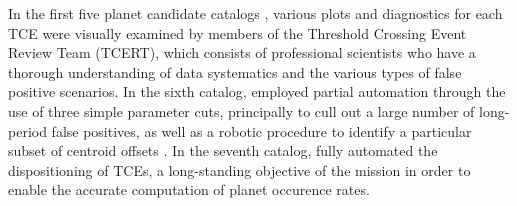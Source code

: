 In the first five \Kepler{} planet candidate catalogs \citep{Borucki2011a,Borucki2011b,Batalha2013,Burke2014,Rowe2015a}, various plots and diagnostics for each TCE were visually examined by members of the Threshold Crossing Event Review Team (TCERT), which consists of professional scientists who have a thorough understanding of \kepler{} data systematics and the various types of false positive scenarios. In the sixth catalog, \citet{Mullally2015cat} employed partial automation through the use of three simple parameter cuts, principally to cull out a large number of long-period false positives, as well as a robotic procedure to identify a particular subset of centroid offsets \citep[see \S5.2 of][]{Mullally2015cat}. In the seventh catalog, \citet{Coughlin2016} fully automated the dispositioning of TCEs, a long-standing objective of the \kepler{} mission in order to enable the accurate computation of planet occurence rates.


%  


%
%


